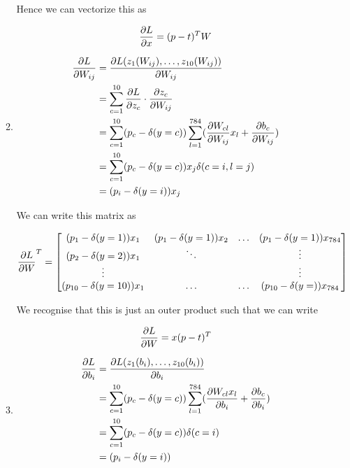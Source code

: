 \documentclass{article}
\begin{document}
\begin{enumerate}[label=(\roman*)]
\begin{enumerate}
    Hence we can vectorize this as

    \begin{equation*}
      \pdv{L}{x} = (p - t)^TW
    \end{equation*}

  \item

    \begin{align*}
      \pdv{L}{W_{ij}} & = \pdv{L(z_1(W_{ij}), \dots, z_{10}(W_{ij}))}{W_{ij}} \\
                      & = \sum_{c=1}^{10}\pdv{L}{z_c} \cdot \pdv{z_c}{W_{ij}} \\
                      & = \sum_{c=1}^{10}(p_c - \delta(y = c)) \sum_{l=1}^{784} ( \pdv{W_{cl}}{W_{ij}}x_l + \pdv{b_c}{W_{ij}} ) \\
                      & = \sum_{c=1}^{10}(p_c - \delta(y = c))x_j\delta(c = i, l = j) \\
                      & = (p_i - \delta(y = i))x_j
    \end{align*}

    We can write this matrix as

    \begin{equation*}
      \pdv{L}{W}^T =
      \begin{bmatrix}
        (p_1 - \delta(y = 1))x_1 & (p_1 - \delta(y = 1))x_2 & \dots & (p_1 - \delta(y = 1))x_{784} \\
        (p_2 - \delta(y = 2))x_1 & \ddots & & \vdots \\
        \vdots & & & \vdots \\
        (p_{10} - \delta(y = 10))x_1 & \dots & \dots & (p_{10} - \delta(y = ))x_{784} \\
      \end{bmatrix}
    \end{equation*}

    We recognise that this is just an outer product such that we can write

    \begin{equation*}
      \pdv{L}{W} = x(p - t)^T
    \end{equation*}

  \item

    \begin{align*}
      \pdv{L}{b_i} & = \pdv{L(z_1(b_i), \dots, z_{10}(b_i))}{b_i} \\
                   & = \sum_{c=1}^{10}(p_c - \delta(y = c))\sum_{l=1}^{784} ( \pdv{W_{cl}x_l}{b_i} + \pdv{b_c}{b_i}) \\
                   & = \sum_{c=1}^{10}(p_c - \delta(y = c))\delta(c = i)\\
                   & = (p_i - \delta(y = i))
    \end{align*}


\end{enumerate}
\end{enumerate}
\end{document}
